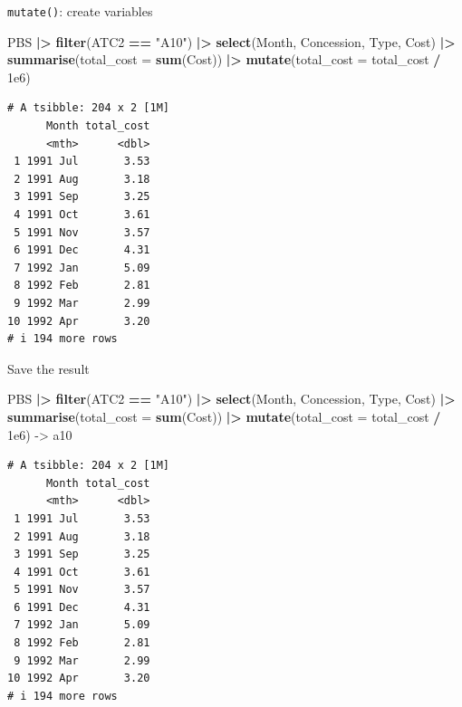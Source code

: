 \documentclass[
  14pt,
  ignorenonframetext,
  aspectratio=169,
]{beamer}
\newenvironment{Shaded}{\begin{snugshade}}{\end{snugshade}}
\newcommand{\AttributeTok}[1]{\textcolor[rgb]{0.13,0.29,0.53}{#1}}
\newcommand{\FloatTok}[1]{\textcolor[rgb]{0.00,0.00,0.81}{#1}}
\newcommand{\FunctionTok}[1]{\textcolor[rgb]{0.13,0.29,0.53}{\textbf{#1}}}
\newcommand{\NormalTok}[1]{#1}
\newcommand{\OtherTok}[1]{\textcolor[rgb]{0.56,0.35,0.01}{#1}}
\newcommand{\SpecialCharTok}[1]{\textcolor[rgb]{0.81,0.36,0.00}{\textbf{#1}}}
\newcommand{\StringTok}[1]{\textcolor[rgb]{0.31,0.60,0.02}{#1}}
\renewenvironment{Shaded}{\vspace*{0.15cm}\color{black}\fontsize{10}{10}\sf\begin{snugshade}\color{black}}{\end{snugshade}}
\begin{document}
\begin{frame}[fragile]{\texttt{mutate()}: create variables}
\protect{}\label{mutate-create-variables}
\fontsize{8}{10}\sf

\begin{Shaded}
\begin{Highlighting}[]
\NormalTok{PBS }\SpecialCharTok{|\textgreater{}}
  \FunctionTok{filter}\NormalTok{(ATC2 }\SpecialCharTok{==} \StringTok{"A10"}\NormalTok{) }\SpecialCharTok{|\textgreater{}}
  \FunctionTok{select}\NormalTok{(Month, Concession, Type, Cost) }\SpecialCharTok{|\textgreater{}}
  \FunctionTok{summarise}\NormalTok{(}\AttributeTok{total\_cost =} \FunctionTok{sum}\NormalTok{(Cost)) }\SpecialCharTok{|\textgreater{}}
  \FunctionTok{mutate}\NormalTok{(}\AttributeTok{total\_cost =}\NormalTok{ total\_cost }\SpecialCharTok{/} \FloatTok{1e6}\NormalTok{)}
\end{Highlighting}
\end{Shaded}

\begin{verbatim}
# A tsibble: 204 x 2 [1M]
      Month total_cost
      <mth>      <dbl>
 1 1991 Jul       3.53
 2 1991 Aug       3.18
 3 1991 Sep       3.25
 4 1991 Oct       3.61
 5 1991 Nov       3.57
 6 1991 Dec       4.31
 7 1992 Jan       5.09
 8 1992 Feb       2.81
 9 1992 Mar       2.99
10 1992 Apr       3.20
# i 194 more rows
\end{verbatim}
\end{frame}

\begin{frame}[fragile]{Save the result}
\protect{}\label{save-the-result}
\fontsize{8}{10}\sf

\begin{Shaded}
\begin{Highlighting}[]
\NormalTok{PBS }\SpecialCharTok{|\textgreater{}}
  \FunctionTok{filter}\NormalTok{(ATC2 }\SpecialCharTok{==} \StringTok{"A10"}\NormalTok{) }\SpecialCharTok{|\textgreater{}}
  \FunctionTok{select}\NormalTok{(Month, Concession, Type, Cost) }\SpecialCharTok{|\textgreater{}}
  \FunctionTok{summarise}\NormalTok{(}\AttributeTok{total\_cost =} \FunctionTok{sum}\NormalTok{(Cost)) }\SpecialCharTok{|\textgreater{}}
  \FunctionTok{mutate}\NormalTok{(}\AttributeTok{total\_cost =}\NormalTok{ total\_cost }\SpecialCharTok{/} \FloatTok{1e6}\NormalTok{) }\OtherTok{{-}\textgreater{}}\NormalTok{ a10}
\end{Highlighting}
\end{Shaded}

\begin{verbatim}
# A tsibble: 204 x 2 [1M]
      Month total_cost
      <mth>      <dbl>
 1 1991 Jul       3.53
 2 1991 Aug       3.18
 3 1991 Sep       3.25
 4 1991 Oct       3.61
 5 1991 Nov       3.57
 6 1991 Dec       4.31
 7 1992 Jan       5.09
 8 1992 Feb       2.81
 9 1992 Mar       2.99
10 1992 Apr       3.20
# i 194 more rows
\end{verbatim}
\end{frame}
\end{document}
